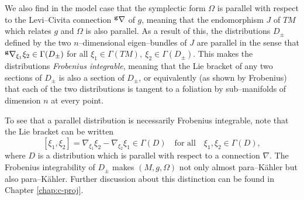We also find in the model case that the symplectic form $\Omega$ is parallel with respect to the Levi--Civita connection $^{\bf g}\nabla$ of $g$, meaning that the endomorphism $J$ of $TM$ which relates $g$ and $\Omega$ is also parallel. As a result of this, the distributions $D_\pm$ defined by the two $n$--dimensional eigen--bundles of $J$ are parallel in the sense that $^{\bf g}\nabla_{\xi_1}\xi_2\in\Gamma(D_\pm)$ for all $\xi_1\in \Gamma(TM),\ \xi_2\in\Gamma(D_\pm)$. This makes the distributions \textit{Frobenius integrable}, meaning that the Lie bracket of any two sections of $D_\pm$ is also a section of $D_\pm$, or equivalently (as shown by Frobenius) that each of the two distributions is tangent to a foliation by sub--manifolds of dimension $n$ at every point.

To see that a parallel distribution is necessarily Frobenius integrable, note that the Lie bracket can be written
\[
[\xi_1,\xi_2]= \nabla_{\xi_1}\xi_2- \nabla_{\xi_2}\xi_1\in\Gamma(D)\quad\mbox{for all}\quad \xi_1,\xi_2\in\Gamma(D),
\]
where $D$ is a distribution which is parallel with respect to a connection $\nabla$. The Frobenius integrability of $D_\pm$ makes $(M,g,\Omega)$ not only almost para--K\"ahler but also para--K\"ahler. Further discussion about this distinction can be found in Chapter \ref{chap:c-proj}.